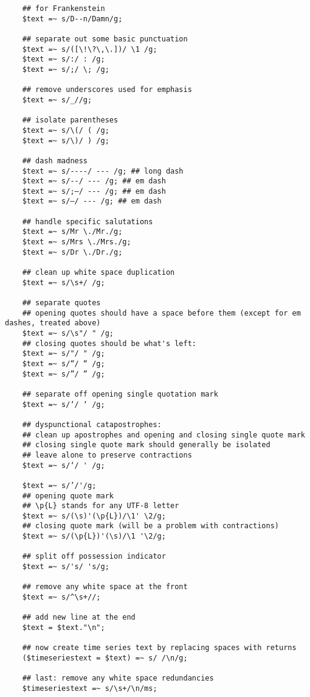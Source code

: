 \begin{verbatim}
    ## for Frankenstein
    $text =~ s/D--n/Damn/g;

    ## separate out some basic punctuation
    $text =~ s/([\!\?\,\.])/ \1 /g;
    $text =~ s/:/ : /g; 
    $text =~ s/;/ \; /g;

    ## remove underscores used for emphasis
    $text =~ s/_//g; 

    ## isolate parentheses
    $text =~ s/\(/ ( /g;
    $text =~ s/\)/ ) /g;

    ## dash madness    
    $text =~ s/----/ --- /g; ## long dash
    $text =~ s/--/ --- /g; ## em dash
    $text =~ s/;—/ --- /g; ## em dash
    $text =~ s/—/ --- /g; ## em dash

    ## handle specific salutations
    $text =~ s/Mr \./Mr./g;
    $text =~ s/Mrs \./Mrs./g;
    $text =~ s/Dr \./Dr./g;

    ## clean up white space duplication
    $text =~ s/\s+/ /g;

    ## separate quotes
    ## opening quotes should have a space before them (except for em dashes, treated above)
    $text =~ s/\s"/ " /g;
    ## closing quotes should be what's left:
    $text =~ s/"/ " /g;
    $text =~ s/“/ “ /g;
    $text =~ s/”/ ” /g;

    ## separate off opening single quotation mark
    $text =~ s/‘/ ‘ /g;

    ## dyspunctional catapostrophes:
    ## clean up apostrophes and opening and closing single quote mark
    ## closing single quote mark should generally be isolated
    ## leave alone to preserve contractions
    $text =~ s/‘/ ' /g;

    $text =~ s/’/'/g;
    ## opening quote mark
    ## \p{L} stands for any UTF-8 letter
    $text =~ s/(\s)'(\p{L})/\1' \2/g;
    ## closing quote mark (will be a problem with contractions)
    $text =~ s/(\p{L})'(\s)/\1 '\2/g;
    
    ## split off possession indicator
    $text =~ s/'s/ 's/g;

    ## remove any white space at the front
    $text =~ s/^\s+//;

    ## add new line at the end
    $text = $text."\n";

    ## now create time series text by replacing spaces with returns
    ($timeseriestext = $text) =~ s/ /\n/g;
    
    ## last: remove any white space redundancies
    $timeseriestext =~ s/\s+/\n/ms;
  
\end{verbatim}

